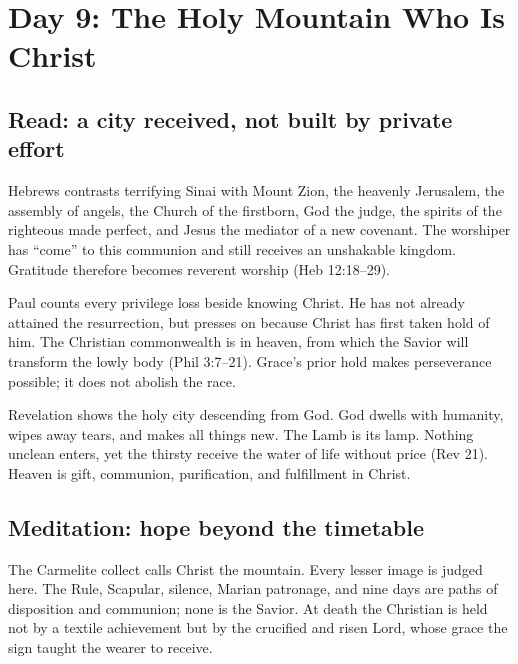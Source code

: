 \section{Day 9: The Holy Mountain Who Is Christ}


\subsection{Read: a city received, not built by private effort}

Hebrews contrasts terrifying Sinai with Mount Zion, the heavenly Jerusalem, the assembly of angels, the Church of the firstborn, God the judge, the spirits of the righteous made perfect, and Jesus the mediator of a new covenant. The worshiper has ``come'' to this communion and still receives an unshakable kingdom. Gratitude therefore becomes reverent worship (Heb 12:18--29).

Paul counts every privilege loss beside knowing Christ. He has not already attained the resurrection, but presses on because Christ has first taken hold of him. The Christian commonwealth is in heaven, from which the Savior will transform the lowly body (Phil 3:7--21). Grace's prior hold makes perseverance possible; it does not abolish the race.

Revelation shows the holy city descending from God. God dwells with humanity, wipes away tears, and makes all things new. The Lamb is its lamp. Nothing unclean enters, yet the thirsty receive the water of life without price (Rev 21). Heaven is gift, communion, purification, and fulfillment in Christ.

\subsection{Meditation: hope beyond the timetable}

The Carmelite collect calls Christ the mountain. Every lesser image is judged here. The Rule, Scapular, silence, Marian patronage, and nine days are paths of disposition and communion; none is the Savior. At death the Christian is held not by a textile achievement but by the crucified and risen Lord, whose grace the sign taught the wearer to receive.

